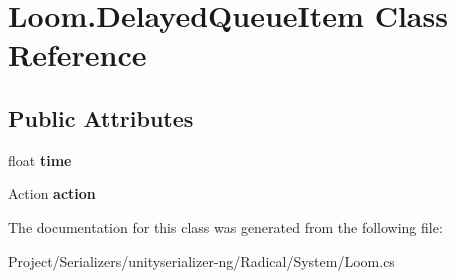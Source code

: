 \hypertarget{class_loom_1_1_delayed_queue_item}{}\section{Loom.\+Delayed\+Queue\+Item Class Reference}
\label{class_loom_1_1_delayed_queue_item}
\subsection*{Public Attributes}
\begin{DoxyCompactItemize}
\item 
\mbox{\label{class_loom_1_1_delayed_queue_item_a31169962a9fc37e848515f0c6552c9ea}} 
float {\bfseries time}
\item 
\mbox{\label{class_loom_1_1_delayed_queue_item_a501c4e9027169254545875db55569355}} 
Action {\bfseries action}
\end{DoxyCompactItemize}


The documentation for this class was generated from the following file\+:\begin{DoxyCompactItemize}
\item 
Project/\+Serializers/unityserializer-\/ng/\+Radical/\+System/Loom.\+cs\end{DoxyCompactItemize}

